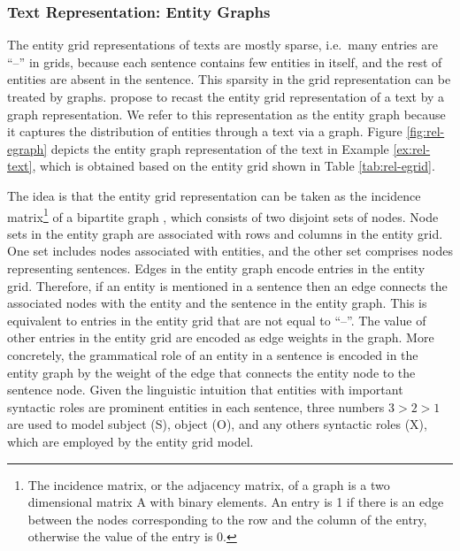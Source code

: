 \subsubsection{Text Representation: Entity Graphs}

The entity grid representations of texts are mostly sparse, i.e.\ many entries are ``--'' in grids, because each sentence contains few entities in itself, and the rest of entities are absent in the sentence. 
This sparsity in the grid representation can be treated by graphs. 
 propose to recast the entity grid representation of a text by a graph representation. 
We refer to this representation as the entity graph because it captures the distribution of entities through a text via a graph. 
Figure \ref{fig:rel-egraph} depicts the entity graph representation of the text in Example \ref{ex:rel-text}, which is obtained based on the entity grid shown in Table \ref{tab:rel-egrid}. 

The idea is that the entity grid representation \cite{barzilay08} can be taken as the incidence matrix\footnote{The incidence matrix, or the adjacency matrix, of a graph is a two dimensional matrix A with binary elements. An entry is 1 if there is an edge between the nodes corresponding to the row and the column of the entry, otherwise the value of the entry is 0.} of a bipartite graph \cite{guinaudeau13}, which consists of two disjoint sets of nodes.  
Node sets in the entity graph are associated with rows and columns in the entity grid. 
One set includes nodes associated with entities, and the other set comprises nodes representing sentences.  
Edges in the entity graph encode entries in the entity grid. %
Therefore, if an entity is mentioned in a sentence then an edge connects the associated nodes with the entity and the sentence in the entity graph. 
This is equivalent to entries in the entity grid that are not equal to ``--''. 
The value of other entries in the entity grid are encoded as edge weights in the graph. 
More concretely, the grammatical role of an entity in a sentence is encoded in the entity graph by the weight of the edge that connects the entity node to the sentence node. 
Given the linguistic intuition that entities with important syntactic roles are prominent entities in each sentence, three numbers $3>2>1$ are used to model subject (S), object (O), and any others syntactic roles (X), which are employed by the entity grid model. 

